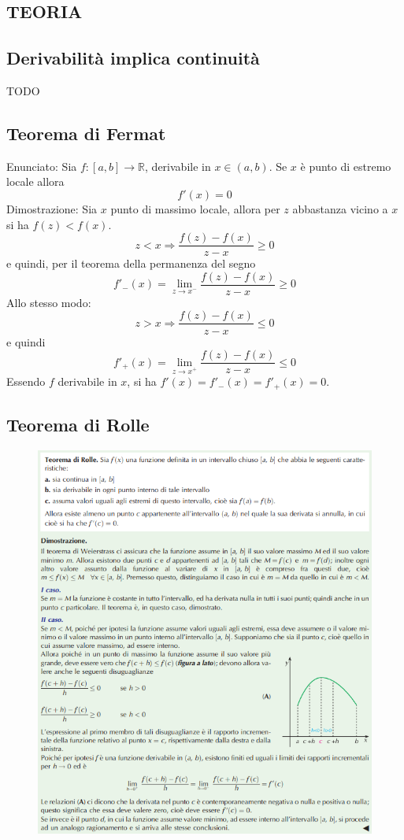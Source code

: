 \documentclass[a4paper, 9pt]{report}
\begin{document}
\subsection*{TEORIA}
\subsection*{Derivabilità implica continuità}
TODO
\newpage
\subsection*{Teorema di Fermat}
Enunciato:\newline
Sia $f:[a,b]\rightarrow \mathbb{R}$, derivabile in $x \in(a,b)$. Se $x$ è punto di estremo locale allora
\[
    f'(x) = 0
\]
Dimostrazione:\newline
Sia $x$ punto di massimo locale, allora per $z$ abbastanza vicino a $x$ si ha $f(z)<f(x)$. 
\[
    z<x \Rightarrow \frac{f(z)-f(x)}{z-x} \geq 0
\]
e quindi, per il teorema della permanenza del segno
\[
    f'_-(x) = \lim_{z\rightarrow x^-} \frac{f(z)-f(x)}{z-x} \geq 0
\]
Allo stesso modo:
\[
    z>x \Rightarrow \frac{f(z)-f(x)}{z-x} \leq 0
\]
e quindi
\[
    f'_+(x) = \lim_{z\rightarrow x^+} \frac{f(z)-f(x)}{z-x} \leq 0
\]
Essendo $f$ derivabile in $x$, si ha $f'(x) = f'_-(x) = f'_+(x) = 0$.
\newpage
\subsection*{Teorema di Rolle}
\begin{figure}[h!]
    \includegraphics[width=\linewidth]{../dim/Rolle.PNG}
\end{figure}
\newpage
\end{document}
